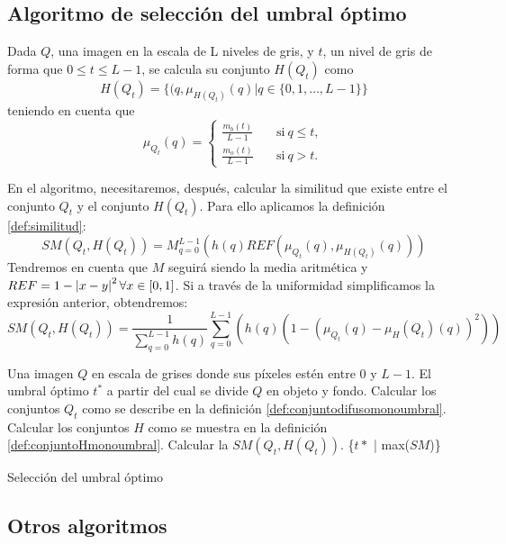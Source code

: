 \documentclass[main]{subfiles}
\begin{document}
\subsection{Algoritmo de selección del umbral óptimo}\label{sec:algoritmo3}

\begin{definition}\label{def:conjuntoHmonoumbral}
Dada $Q$, una imagen en la escala de L niveles de gris, y $t$, un nivel de gris de forma que $0\leq t\leq L-1$, se calcula su conjunto $H(Q_t)$ como
$$H(Q_t) = \{(q, \mu_{H(Q_t)}(q)|q\in \{0,1,\dots, L-1\}\}$$
teniendo en cuenta que
$$\mu_{Q_t}(q) = \left\{ \begin{aligned}
    \frac{m_b(t)}{L-1} & \quad\text{si}\ q\leq t,\\
    \frac{m_o(t)}{L-1} & \quad\text{si}\ q> t.
 \end{aligned}\right.$$
 \end{definition}

En el algoritmo, necesitaremos, después, calcular la similitud que existe entre el conjunto $Q_t$ y el conjunto $H(Q_t)$. Para ello aplicamos la definición \ref{def:similitud}:
$$SM(Q_t, H(Q_t)) = M^{L-1}_{q=0}(h(q)REF(\mu_{Q_t}(q), \mu_{H(Q_t)}(q)))$$
Tendremos en cuenta que $M$ seguirá siendo la media aritmética y $REF=1-\left\vert x-y\right\vert^2 \forall x\in[0,1]$. Si a través de la uniformidad simplificamos la expresión anterior, obtendremos:
$$SM(Q_t, H(Q_t)) = \frac{1}{\sum_{q=0}^{L-1}h(q)} \sum_{q=0}^{L-1}\left(h(q)(1-(\mu_{Q_t}(q)-\mu_H{(Q_t)}(q))^2)\right)$$

\begin{algorithm}[!ht]
\begin{algorithmic}[1]
\REQUIRE Una imagen $Q$ en escala de grises donde sus píxeles estén entre $0$ y $L-1$.
\ENSURE El umbral óptimo $t^*$ a partir del cual se divide $Q$ en objeto y fondo.
\STATE Calcular los conjuntos $Q_t$ como se describe en la definición \ref{def:conjuntodifusomonoumbral}.
\STATE Calcular los conjuntos $H$ como se muestra en la definición \ref{def:conjuntoHmonoumbral}.
\STATE Calcular la $SM(Q_t, H(Q_t))$.
\ENDFOR
\RETURN \{$t*$ | max($SM$)\}
\end{algorithmic}
\caption{Selección del umbral óptimo}\label{alg:algoritmo3}
\end{algorithm}



\subsection{Otros algoritmos}\label{sec:otrosalgoritmos}
\end{document}
